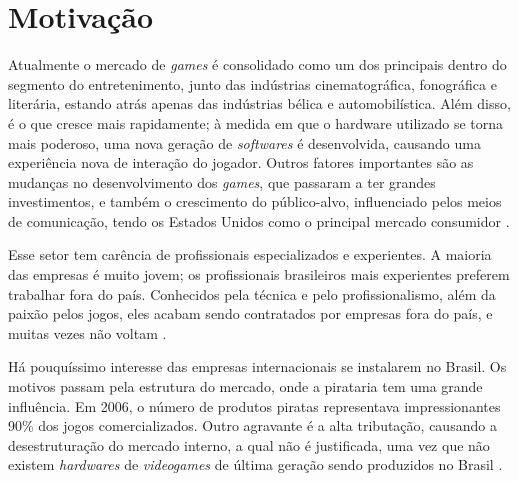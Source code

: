 \section{Motivação}
%
%
%
%
Atualmente o mercado de \textit{games} é consolidado como um dos principais dentro do segmento do entretenimento, junto das indústrias cinematográfica, fonográfica e literária, estando atrás apenas das indústrias bélica e automobilística. Além disso, é o que cresce mais rapidamente; à medida em que o hardware utilizado se torna mais poderoso, uma nova geração de \textit{softwares} é desenvolvida, causando uma experiência nova de interação do jogador. Outros fatores importantes são as mudanças no desenvolvimento dos \textit{games}, que passaram a ter grandes investimentos, e também o crescimento do público-alvo, influenciado pelos meios de comunicação, tendo os Estados Unidos como o principal mercado consumidor \cite{GEDIGames}.
%
%
%

Esse setor tem carência de profissionais especializados e experientes. A maioria das empresas é muito jovem; os profissionais brasileiros mais experientes preferem trabalhar fora do país. Conhecidos pela técnica e pelo profissionalismo, além da paixão pelos jogos, eles acabam sendo contratados por empresas fora do país, e muitas vezes não voltam \cite{GEDIGames}.

Há pouquíssimo interesse das empresas internacionais se instalarem no Brasil. Os motivos passam pela estrutura do mercado, onde a pirataria tem uma grande influência. Em 2006, o número de produtos piratas representava impressionantes 90\% dos jogos comercializados. Outro agravante é a alta tributação, causando a desestruturação do mercado interno, a qual não é justificada, uma vez que não existem \textit{hardwares} de \textit{videogames} de última geração sendo produzidos no Brasil \cite{GEDIGames}.


